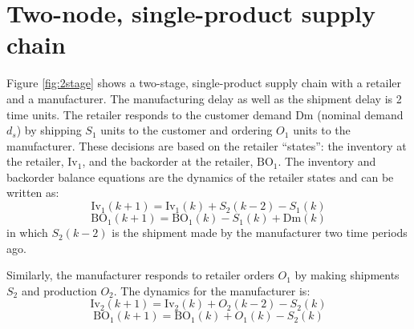 \documentclass{elsarticle}
\newcommand{\BO}{\textrm{BO}}
\newcommand{\Inv}{\textrm{Iv}}
\newcommand{\Dem}{\textrm{Dm}}
\theoremstyle{definition}
\begin{document}
\section{Two-node, single-product supply chain}
\label{sec:model}
Figure \ref{fig:2stage} shows a two-stage, single-product supply chain with a retailer
and a manufacturer. The manufacturing delay as well as the shipment
delay is 2 time units. The retailer responds to the customer demand
$\Dem$ (nominal demand $d_s$) by shipping $S_1$ units to the customer and
ordering $O_1$ units to the manufacturer. These decisions are based on
the retailer ``states'': the inventory at the retailer, $\Inv_1$,  and the
backorder at the retailer, $\BO_1$. The inventory and backorder
balance equations are the dynamics of the retailer states and can be
written as:
\[ \Inv_1(k+1) = \Inv_1(k) + S_2(k-2) -S_1(k) \]
\[ \BO_1(k+1) = \BO_1(k) -S_1(k) + \Dem(k) \]
in which $S_2(k-2)$ is the shipment made by the manufacturer two time
periods ago. 

Similarly, the manufacturer responds to retailer orders $O_1$ by
making shipments $S_2$ and production $O_2$. The dynamics for the
manufacturer is:
\[ \Inv_2(k+1) = \Inv_2(k) + O_2(k-2) - S_2(k) \]
\[ \BO_1(k+1)  = \BO_1(k) + O_1(k) - S_2(k) \]
\end{document}
